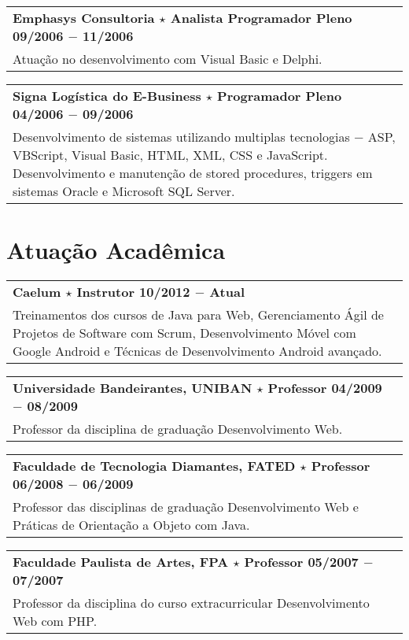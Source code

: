 \documentclass[a4paper, oneside, final]{scrartcl}
\newcommand{\vspc}{\vspace{0.15cm}} %
\begin{document}
\begin{center}
\begin{tabularx}{1\linewidth}{X}
{\bf Emphasys Consultoria $\star$ Analista Programador Pleno  \hfill 09/2006 $-$ 11/2006} \\
Atuação no desenvolvimento com Visual Basic e Delphi. \vspc\\
\end{tabularx}

\begin{tabularx}{1\linewidth}{X}
{\bf Signa Logística do E-Business $\star$ Programador Pleno  \hfill 04/2006 $-$ 09/2006} \\
Desenvolvimento de sistemas utilizando multiplas tecnologias $-$ ASP, VBScript, Visual Basic, HTML, XML, CSS e JavaScript. Desenvolvimento e manutenção de stored procedures, triggers em sistemas Oracle e Microsoft SQL Server. \vspc\\
\end{tabularx}

\section{Atuação Acadêmica}
\begin{tabularx}{1\linewidth}{X}
{\bf Caelum $\star$ Instrutor  \hfill 10/2012 $-$ Atual} \\
Treinamentos dos cursos de Java para Web, Gerenciamento Ágil de Projetos de Software com Scrum, Desenvolvimento Móvel com Google Android e Técnicas de Desenvolvimento Android avançado. \vspc\\
\end{tabularx}

\begin{tabularx}{1\linewidth}{X}
{\bf Universidade Bandeirantes, UNIBAN $\star$ Professor \hfill 04/2009 $-$ 08/2009} \\
Professor da disciplina de graduação Desenvolvimento Web. \vspc\\
\end{tabularx}

\begin{tabularx}{1\linewidth}{X}
{\bf Faculdade de Tecnologia Diamantes, FATED $\star$ Professor \hfill 06/2008 $-$ 06/2009} \\
Professor das disciplinas de graduação Desenvolvimento Web e Práticas de Orientação a Objeto com Java. \vspc\\
\end{tabularx}

\begin{tabularx}{1\linewidth}{X}
{\bf Faculdade Paulista de Artes, FPA $\star$ Professor  \hfill 05/2007 $-$ 07/2007} \\
Professor da disciplina do curso extracurricular Desenvolvimento Web com PHP. \vspc\\
\end{tabularx}



\end{center}
\end{document}

